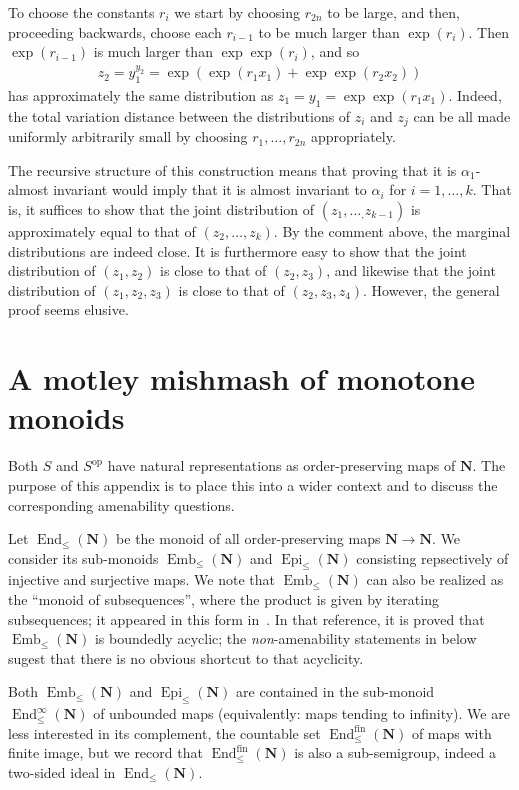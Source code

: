\documentclass[12pt, pdflatex]{amsart}
\theoremstyle{definition}
\numberwithin{equation}{section}
\numberwithin{theorem}{section}
\newcommand{\NN}{\mathbf{N}}
\DeclareMathOperator{\End}{End}
\DeclareMathOperator{\Emb}{Emb}
\DeclareMathOperator{\Epi}{Epi}
\begin{document}
To choose the constants $r_i$ we start by choosing $r_{2n}$ to be large, and then, proceeding backwards, choose each $r_{i-1}$ to be much larger than $\exp(r_{i})$. Then $\exp(r_{i-1})$ is much larger than $\exp\exp(r_i)$, and so
\begin{align*}
    z_2 = y_1^{y_2} = \exp\left(\exp(r_1 x_1)+\exp\exp(r_2 x_2)\right)
\end{align*}
has approximately the same distribution as $z_1=y_1=\exp\exp(r_1 x_1)$. Indeed, the total variation distance between the distributions of $z_i$ and $z_j$ can be all made uniformly arbitrarily small by choosing $r_1,\ldots,r_{2n}$ appropriately.

The recursive structure of this construction means that proving that it is $\alpha_1$-almost invariant would imply that it is almost invariant to $\alpha_i$ for $i=1,\ldots,k$. That is, it suffices to show that the joint distribution of $(z_1,\ldots_,z_{k-1})$ is approximately equal to that of $(z_2,\ldots,z_k)$. By the comment above, the marginal distributions are indeed close. It is furthermore easy to show that the joint distribution of $(z_1,z_2)$ is close to that of $(z_2,z_3)$, and likewise that the joint distribution of $(z_1,z_2,z_3)$ is close to that of $(z_2,z_3,z_4)$. However, the general proof seems elusive. 


\section{A motley mishmash of monotone monoids}\label{sec:related}
Both $S$ and $S^\mathrm{op}$ have natural representations as order-preserving maps of $\NN$. The purpose of this appendix is to place this into a wider context and to discuss the corresponding amenability questions.

\medskip

Let $\End_\leq(\NN)$ be the monoid of all order-preserving maps $\NN\to\NN$. We consider its sub-monoids $\Emb_\leq(\NN)$ and $\Epi_\leq(\NN)$ consisting repsectively of injective and surjective maps. We note that $\Emb_\leq(\NN)$ can also be realized as the ``monoid of subsequences'', where the product is given by iterating subsequences; it appeared in this form in~\cite{FFMN}. In that reference, it is proved that $\Emb_\leq(\NN)$ is boundedly acyclic; the \emph{non}-amenability statements in  below sugest that there is no obvious shortcut to that acyclicity.

Both $\Emb_\leq(\NN)$ and $\Epi_\leq(\NN)$ are contained in the sub-monoid $\End_\leq^\infty(\NN)$ of unbounded maps (equivalently: maps tending to infinity). We are less interested in its complement, the countable set $\End_\leq^\mathrm{fin}(\NN)$ of maps with finite image, but we record that $\End_\leq^\mathrm{fin}(\NN)$ is also a sub-semigroup, indeed a two-sided ideal in $\End_\leq(\NN)$.
\end{document}
